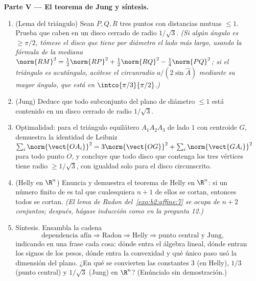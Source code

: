 \begin{problem}
\medskip
\noindent\textbf{Parte V --- El teorema de Jung y síntesis.}
\begin{enumerate}[resume]
  \item (Lema del triángulo) Sean $P, Q, R$ tres puntos con
        distancias mutuas $\leq 1$. Prueba que caben en un disco
        cerrado de radio $1/\sqrt3$. \emph{(Si algún ángulo es $\geq
        \pi/2$, tómese el disco que tiene por diámetro el lado más
        largo, usando la fórmula de la mediana $\norm{RM}^2 =
        \tfrac12\norm{RP}^2 + \tfrac12\norm{RQ}^2 -
        \tfrac14\norm{PQ}^2$; si el triángulo es acutángulo, acótese
        el circunradio $a/(2\sin \widehat A)$ mediante su mayor
        ángulo, que está en $\intco{\pi/3}{\pi/2}$.)}
  \item (Jung) Deduce que todo subconjunto  del plano de
        diámetro $\leq 1$ está contenido en un disco cerrado de radio
        $1/\sqrt3$.
  \item Optimalidad: para el triángulo equilátero $A_1A_2A_3$ de lado
        $1$ con centroide $G$, demuestra la identidad de Leibniz
        $\sum_i \norm{\vect{OA_i}}^2 = 3\norm{\vect{OG}}^2 + \sum_i
        \norm{\vect{GA_i}}^2$ para todo punto $O$, y concluye que
        todo disco que contenga los tres vértices tiene radio $\geq
        1/\sqrt3$, con igualdad solo para el disco circunscrito.
  \item (Helly en $\R^n$) Enuncia y demuestra el teorema de Helly en
        $\R^n$: si un número finito de  es tal que
        cualesquiera $n + 1$ de ellos se cortan, entonces todos se
        cortan. \emph{(El lema de Radon del~\cref{exo:b2:affine:7} se ocupa de $n + 2$ conjuntos; después,
        hágase inducción como en la pregunta 12.)}
  \item Síntesis. Ensambla la cadena
        \[
        \text{dependencia afín} \Rightarrow \text{Radon}
        \Rightarrow \text{Helly} \Rightarrow
        \text{punto central y Jung},
        \]
        indicando en una frase cada cosa: dónde entra el álgebra
        lineal, dónde entran los signos de los pesos, dónde entra la
        convexidad y qué único paso usó la dimensión del plano. ¿En
        qué se convierten las constantes $3$ (en Helly), $1/3$ (punto
        central) y $1/\sqrt3$ (Jung) en $\R^n$? (Enúncialo sin
        demostración.)
\end{enumerate}
\end{problem}
